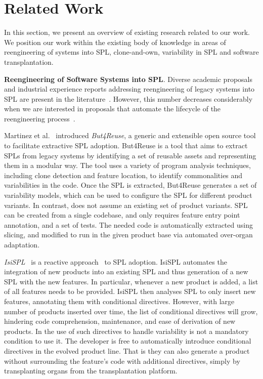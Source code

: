 \section{Related Work} \label{sec:related_work}

In this section, we present an overview of existing research related to our work. We position our work within the existing body of knowledge in areas of reengineering of systems into SPL, clone-and-own, variability in SPL and software transplantation. 

\textbf{Reengineering of Software Systems into SPL}. Diverse academic proposals and industrial experience reports addressing reengineering of legacy systems into SPL are present in the literature~\cite{Assuncao2017}. However, this number decreases considerably when we are interested in proposals that automate the lifecycle of the reengineering process~\cite{Kruger2020}. 
 
Martinez et al.~\cite{Martinez2015} introduced \emph{But4Reuse}, a generic and extensible open source tool to facilitate extractive SPL adoption. But4Reuse is a tool that aims to extract SPLs from legacy systems by identifying a set of reusable assets and representing them in a modular way. The tool uses a variety of program analysis techniques, including clone detection and feature location, to identify commonalities and variabilities in the code. Once the SPL is extracted, But4Reuse generates a set of variability models, which can be used to configure the SPL for different product variants. In contrast, \FOUNDRY does not assume an existing set of product variants. 
SPL can be created from a single codebase, and only requires feature entry point annotation, and a set of tests.
The needed code is automatically extracted using slicing, and modified to run in the given product base via automated over-organ adaptation.

\emph{IsiSPL}~\cite{hlad2021} is a reactive approach~\cite{Krueger2001} to SPL adoption. 
IsiSPL automates the integration of new products into an existing SPL and thus generation of a new SPL with the new features.
In particular, whenever a new product is added, a list of all features needs to be provided.
IsiSPL then analyses SPL to only insert new features, annotating them with conditional directives. However, with large number of products inserted over time, the list of conditional directives will grow, hindering code comprehension, maintenance, and ease of derivation of new products. In \FOUNDRY the use of such directives to handle variability is not a mandatory condition to use it. The developer is free to automatically introduce conditional directives in the evolved product line. That is they can also generate a product without surrounding the feature's code with additional directives, simply by transplanting organs from the transplantation platform. 

